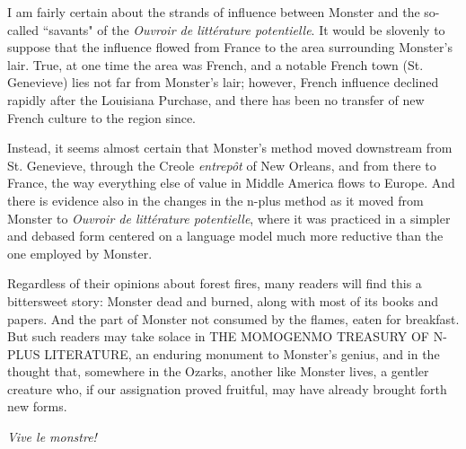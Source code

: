 \par
I am fairly certain about the strands of influence between Monster and the so-called ``savants" of the \textit{Ouvroir de littérature potentielle}.  It would be slovenly to suppose that the influence flowed from France to the area surrounding Monster's lair.  True, at one time the area was French, and a notable French town (St. Genevieve) lies not far from Monster's lair; however, French influence declined rapidly after the Louisiana Purchase, and there has been no transfer of new French culture to the region since.
\par
Instead, it seems almost certain that Monster's method moved downstream from St. Genevieve, through the Creole \textit{entrepôt} of New Orleans, and from there to France, the way everything else of value in Middle America flows to Europe.  And there is evidence also in the changes in the n-plus method as it moved from Monster to \textit{Ouvroir de littérature potentielle}, where it was practiced in a simpler and debased form centered on a language model much more reductive than the one employed by Monster. 
\par
Regardless of their opinions about forest fires, many readers will find this a bittersweet story: Monster dead and burned, along with most of its books and papers.  And the part of Monster not consumed by the flames, eaten for breakfast.  But such readers may take solace in THE MOMOGENMO TREASURY OF N-PLUS LITERATURE, an enduring monument to Monster's genius, and in the thought that, somewhere in the Ozarks, another like Monster lives, a gentler creature who, if our assignation proved fruitful, may have already brought forth new forms.
\par
\textit{Vive le monstre!}
